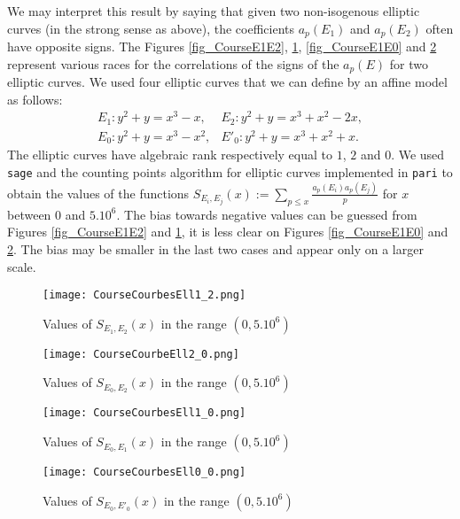 \documentclass[a4paper,10pt]{amsart}
\theoremstyle{plain}
\theoremstyle{definition}
\begin{document}
We may interpret this result by saying that given two non-isogenous elliptic curves (in the strong sense as above),
the coefficients $a_{p}(E_{1})$ and $a_{p}(E_{2})$ often have opposite signs.
The Figures \ref{fig_CourseE1E2}, \ref{fig_CourseE0E2}, \ref{fig_CourseE1E0} and \ref{fig_CourseE0E'0} represent various races for the correlations of the signs of the $a_{p}(E)$ for two elliptic curves. 
We used four elliptic curves that we can define by an affine model as follows:
$$\begin{array}{cc}
E_{1} : y^{2} + y = x^{3} - x , &  E_{2} : y^{2} + y = x^{3} + x^{2} - 2x ,\\
E_{0} : y^{2} + y = x^{3} - x^{2} , &  E'_{0} : y^{2} + y = x^{3} + x^{2} + x.
\end{array}$$
The elliptic curves have algebraic rank respectively equal to $1$, $2$ and $0$.
We used \texttt{sage} and the counting points algorithm for elliptic curves implemented in \texttt{pari} to obtain the values of the functions $S_{E_{i},E_{j}}(x):=\sum_{p\leq x}\frac{a_{p}(E_{i})a_{p}(E_{j})}{p}$ for $x$ between $0$ and $5.10^{6}$.
The bias towards negative values can be guessed from Figures \ref{fig_CourseE1E2} and \ref{fig_CourseE0E2}, 
it is less clear on Figures \ref{fig_CourseE1E0} and \ref{fig_CourseE0E'0}.
The bias may be smaller in the last two cases and appear only on a larger scale. 

\begin{figure}
   \begin{minipage}[c]{.46\linewidth}
      \texttt{[image: CourseCourbesEll1\_2.png]}
      
      \caption{Values of $S_{E_{1},E_{2}}(x)$ in the range $(0,5.10^{6})$}
      \label{fig_CourseE1E2}
   \end{minipage} \hfill
   \begin{minipage}[c]{.46\linewidth}
      \texttt{[image: CourseCourbeEll2\_0.png]}
      
      	\caption{Values of $S_{E_{0},E_{2}}(x)$ in the range $(0,5.10^{6})$}
      	\label{fig_CourseE0E2}
   \end{minipage}
\end{figure}

\begin{figure}
   \begin{minipage}[c]{.46\linewidth}
      \texttt{[image: CourseCourbesEll1\_0.png]}
      
      \caption{Values of $S_{E_{0},E_{1}}(x)$ in the range $(0,5.10^{6})$}
      \label{fig_CourseE1E0}
   \end{minipage} \hfill
   \begin{minipage}[c]{.46\linewidth}
      \texttt{[image: CourseCourbesEll0\_0.png]}
      
      	\caption{Values of $S_{E_{0},E'_{0}}(x)$ in the range $(0,5.10^{6})$}
      	\label{fig_CourseE0E'0}
   \end{minipage}
\end{figure}
\end{document}
